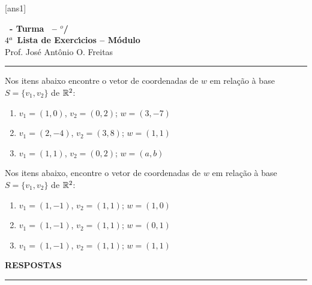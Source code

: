\documentclass[12pt]{exam}
\begin{document}
    [ans1]
    
    \begin{center}
        {\Large\bf \disciplina\ - Turma \turma\ -- \semestre$^{o}$/\ano} \\ \vspace{9pt} {\large\bf
            $4^a$ Lista de Exerc{\'\i}cios -- Módulo \numeromodulo}\\ \vspace{9pt} Prof. Jos{\'e} Ant{\^o}nio O. Freitas
    \end{center}
    
    \hrule

    \begin{exercicio}
        Nos itens abaixo encontre o vetor de coordenadas de $w$ em relação à base  $S = \{v_1, v_2\}$ de $\mathbb{R}^2$:
        \begin{enumerate}
            \item $v_1 = (1, 0)$, $v_2 = (0, 2)$; $w = (3, -7)$
            \item $v_1 = (2, -4)$, $v_2 = (3, 8)$; $w = (1, 1)$
            \item $v_1 = (1, 1)$, $v_2 = (0, 2)$; $w = (a, b)$
        \end{enumerate}
    \end{exercicio}

    \begin{exercicio}
        Nos itens abaixo, encontre o vetor de coordenadas de $w$ em relação à base $S = \{v_1, v_2\}$ de $\mathbb{R}^2$:
        \begin{enumerate}
            \item $v_1 = (1, -1)$, $v_2 = (1, 1)$; $w = (1, 0)$
            \item $v_1 = (1, -1)$, $v_2 = (1, 1)$; $w = (0, 1)$
            \item $v_1 = (1, -1)$, $v_2 = (1, 1)$; $w = (1, 1)$
        \end{enumerate}
    \end{exercicio}

    \newpage
    

    \begin{center}
        {\large\bf RESPOSTAS}
    \end{center}

    \hrule
    
    
\end{document}
